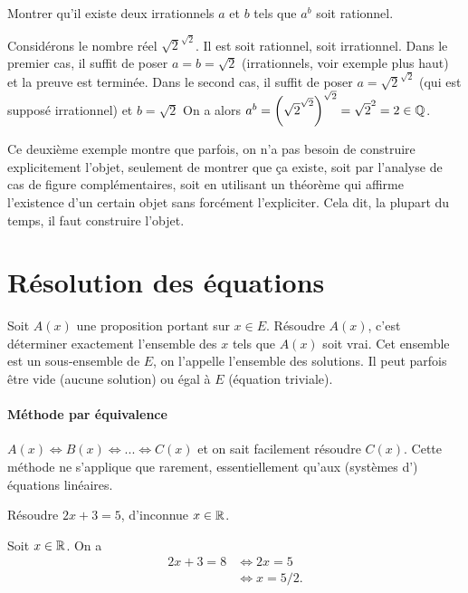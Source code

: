{\begin{exemple}
Montrer qu'il existe deux irrationnels $a$ et $b$ tels que $a^b$ soit rationnel.
\begin{red}
Considérons le nombre réel $\sqrt{2}^{\sqrt{2}}$. Il est soit rationnel, soit irrationnel. Dans le premier cas, il suffit de poser $a=b=\sqrt{2}$ (irrationnels, voir exemple plus haut) et la preuve est terminée. Dans le second cas, il suffit de poser $a=\sqrt{2}^{\sqrt{2}}$ (qui est supposé irrationnel) et $b=\sqrt{2}$ On a alors $a^b = \left(\sqrt{2}^{\sqrt{2}}\right)^{\sqrt{2}} = \sqrt{2}^2 = 2 \in \mathbb{Q}$.
\end{red}
\end{exemple}

Ce deuxième exemple montre que parfois, on n'a pas besoin de construire explicitement l'objet, seulement de montrer que ça existe, soit par l'analyse de cas de figure complémentaires, soit en utilisant un théorème qui affirme l'existence d'un certain objet sans forcément l'expliciter. Cela dit, la plupart du temps, il faut construire l'objet.


\section{Résolution des équations}

Soit $A(x)$ une proposition portant sur $x\in E$. Résoudre $A(x)$, c'est déterminer exactement l'ensemble des $x$ tels que $A(x)$ soit vrai. Cet ensemble est un sous-ensemble de $E$, on l'appelle l'ensemble des solutions. Il peut parfois être vide (aucune solution) ou égal à $E$ (équation triviale).


\paragraph{Méthode par équivalence}$ $\\
$A(x) \Leftrightarrow B(x) \Leftrightarrow ... \Leftrightarrow C(x)$ et on sait facilement résoudre $C(x)$. Cette méthode ne  s'applique que rarement, essentiellement qu'aux (systèmes d') équations linéaires.

\begin{exemple}
Résoudre $2x+3=5$, d'inconnue $x\in \mathbb{R}$.
\begin{red}
Soit $x\in \mathbb{R}$. On a 
\begin{align*}
2x+3=8
&\iff 2x=5\\
&\iff x=5/2.
\end{align*}
\end{red}
\end{exemple}

}
